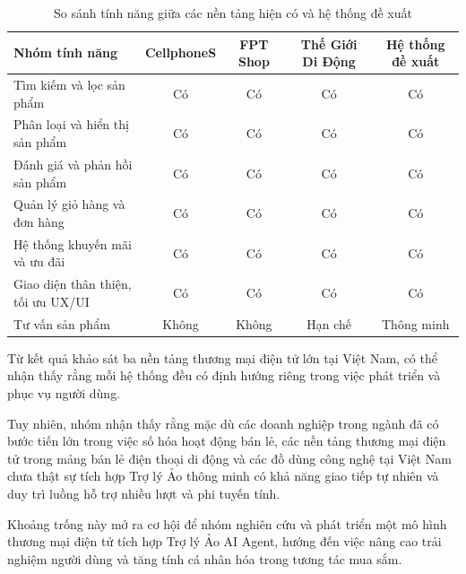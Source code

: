 \begin{table}[H]
\centering
\caption{So sánh tính năng giữa các nền tảng hiện có và hệ thống đề xuất}
\renewcommand{\arraystretch}{1.5}
\begin{tabular}{|p{5.5cm}|c|c|c|c|}
\hline
\textbf{Nhóm tính năng} & \textbf{CellphoneS} & \textbf{FPT Shop} & \textbf{Thế Giới Di Động} & \textbf{Hệ thống đề xuất} \\
\hline
Tìm kiếm và lọc sản phẩm & Có & Có & Có & Có \\
\hline
Phân loại và hiển thị sản phẩm & Có & Có & Có & Có \\
\hline
Đánh giá và phản hồi sản phẩm & Có & Có & Có & Có \\
\hline
Quản lý giỏ hàng và đơn hàng & Có & Có & Có & Có \\
\hline
Hệ thống khuyến mãi và ưu đãi & Có & Có & Có & Có \\
\hline
Giao diện thân thiện, tối ưu UX/UI & Có & Có & Có & Có \\
\hline
Tư vấn sản phẩm & Không & Không & Hạn chế & Thông minh \\
\hline
\end{tabular}
\renewcommand{\arraystretch}{1.0}
\end{table}

Từ kết quả khảo sát ba nền tảng thương mại điện tử lớn tại Việt Nam, có thể nhận thấy rằng mỗi hệ thống đều có định hướng riêng trong việc phát triển và phục vụ người dùng.

Tuy nhiên, nhóm nhận thấy rằng mặc dù các doanh nghiệp trong ngành đã có bước tiến lớn trong việc số hóa hoạt động bán lẻ, các nền tảng thương mại điện tử trong mảng bán lẻ điện thoại di động và các đồ dùng công nghệ tại Việt Nam chưa thật sự tích hợp Trợ lý Ảo thông minh có khả năng giao tiếp tự nhiên và duy trì luồng hỗ trợ nhiều lượt và phi tuyến tính.

Khoảng trống này mở ra cơ hội để nhóm nghiên cứu và phát triển một mô hình thương mại điện tử tích hợp Trợ lý Ảo AI Agent, hướng đến việc nâng cao trải nghiệm người dùng và tăng tính cá nhân hóa trong tương tác mua sắm.
